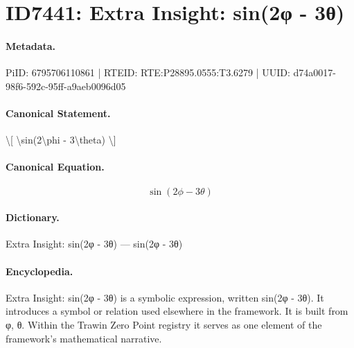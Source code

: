 \section*{ID7441: Extra Insight: sin(2φ - 3θ)}
\paragraph{Metadata.}
PiID: 6795706110861 | RTEID: RTE:P28895.0555:T3.6279 | UUID: d74a0017-98f6-592c-95ff-a9aeb0096d05

\paragraph{Canonical Statement.}
\textbackslash{}[ \textbackslash{}sin(2\textbackslash{}phi - 3\textbackslash{}theta) \textbackslash{}]

\paragraph{Canonical Equation.}
\[
\sin(2\phi - 3\theta)
\]

\paragraph{Dictionary.}
Extra Insight: sin(2φ - 3θ) — sin(2φ - 3θ)

\paragraph{Encyclopedia.}
Extra Insight: sin(2φ - 3θ) is a symbolic expression, written sin(2φ - 3θ). It introduces a symbol or relation used elsewhere in the framework. It is built from φ, θ. Within the Trawin Zero Point registry it serves as one element of the framework's mathematical narrative.
